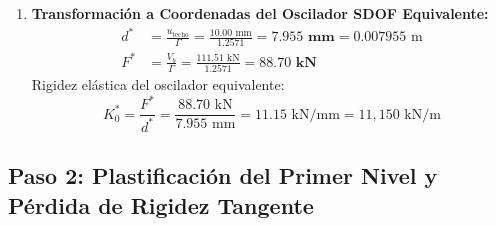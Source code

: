 \documentclass[11pt,letterpaper]{article}
\begin{document}
\begin{examplebox}
\begin{enumerate}
    \item \textbf{Transformación a Coordenadas del Oscilador SDOF Equivalente:}
    \begin{align}
        d^* &= \frac{u_{\text{techo}}}{\Gamma} = \frac{10.00\text{ mm}}{1.2571} = \mathbf{7.955\text{ mm}} = 0.007955\text{ m}\\
        F^* &= \frac{V_b}{\Gamma} = \frac{111.51\text{ kN}}{1.2571} = \mathbf{88.70\text{ kN}}
    \end{align}
    Rigidez elástica del oscilador equivalente:
    \begin{equation}
        K_0^* = \frac{F^*}{d^*} = \frac{88.70\text{ kN}}{7.955\text{ mm}} = 11.15\text{ kN/mm} = 11,150\text{ kN/m}
    \end{equation}
\end{enumerate}
\end{examplebox}

\subsection{Paso 2: Plastificación del Primer Nivel y Pérdida de Rigidez Tangente}
\end{document}
